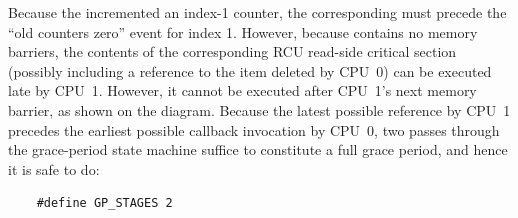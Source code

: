 Because the  incremented an index-1 counter,
the corresponding  must
precede the ``old counters zero'' event for index 1.
However, because  contains no memory
barriers, the contents of the corresponding RCU read-side critical
section (possibly including a reference to the item deleted by
CPU~0) can be executed late by CPU~1.
However, it cannot be executed after CPU~1's next memory barrier,
as shown on the diagram.
Because the latest possible reference by CPU~1 precedes the
earliest possible callback invocation by CPU~0, two passes
through the grace-period state machine suffice to constitute
a full grace period, and hence it is safe to do:

\vspace{5pt}
\begin{minipage}[t]{\columnwidth}
\small
\begin{verbatim}
    #define GP_STAGES 2
\end{verbatim}
\end{minipage}
\vspace{5pt}

